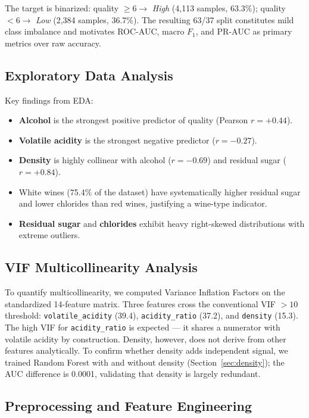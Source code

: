 \documentclass[conference]{IEEEtran}
\begin{document}
The target is binarized: quality $\ge 6 \to$ \emph{High}
(4{,}113 samples, 63.3\%); quality $< 6 \to$ \emph{Low} (2{,}384
samples, 36.7\%). The resulting 63/37 split constitutes mild class
imbalance and motivates ROC-AUC, macro $F_1$, and PR-AUC as primary
metrics over raw accuracy.

\subsection{Exploratory Data Analysis}

Key findings from EDA:
\begin{itemize}
\item \textbf{Alcohol} is the strongest positive predictor of quality
(Pearson $r = +0.44$).
\item \textbf{Volatile acidity} is the strongest negative predictor
($r = -0.27$).
\item \textbf{Density} is highly collinear with alcohol ($r = -0.69$)
and residual sugar ($r = +0.84$).
\item White wines (75.4\% of the dataset) have systematically higher
residual sugar and lower chlorides than red wines, justifying a
wine-type indicator.
\item \textbf{Residual sugar} and \textbf{chlorides} exhibit heavy
right-skewed distributions with extreme outliers.
\end{itemize}

\subsection{VIF Multicollinearity Analysis}

To quantify multicollinearity, we computed Variance Inflation Factors
on the standardized 14-feature matrix. Three features cross the
conventional VIF $> 10$ threshold: \texttt{volatile\_acidity} (39.4),
\texttt{acidity\_ratio} (37.2), and \texttt{density} (15.3). The high
VIF for \texttt{acidity\_ratio} is expected --- it shares a numerator
with volatile acidity by construction. Density, however, does not
derive from other features analytically. To confirm whether density
adds independent signal, we trained Random Forest with and without
density (Section~\ref{sec:density}); the AUC difference is 0.0001,
validating that density is largely redundant.

\subsection{Preprocessing and Feature Engineering}
\end{document}
